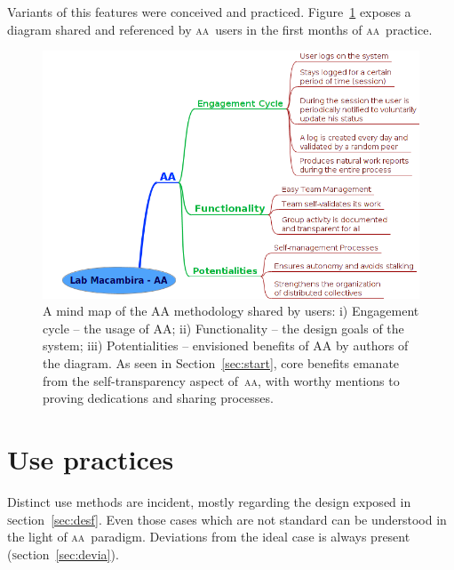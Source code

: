 \documentclass[a4paper, 11pt]{article} %
\newcommand{\sectionb}{\textsc{s}ection}
\newcommand{\aab}{\textsc{aa}}
\begin{document}
Variants of this features were conceived and practiced. Figure~\ref{fig:consult} exposes a diagram shared and referenced by \aab\ users in the first months of \aab\ practice.


\begin{figure}[!h]
    \centering
    \includegraphics[width=\textwidth]{imgs/aaFirstMethodology}
    \caption{A mind map of the AA methodology shared by users: i) Engagement cycle – the usage of AA; ii) Functionality – the design goals of the system; iii) Potentialities – envisioned benefits of AA by authors of the diagram. As seen in Section~\ref{sec:start}, core benefits emanate from the self-transparency aspect of~\aab, with worthy mentions to proving dedications and sharing processes.} 
    \label{fig:consult}
\end{figure}




\section{Use practices}\label{sec:use}
Distinct use methods are incident, mostly regarding the design exposed in \sectionb~\ref{sec:desf}. Even those cases which are not standard can be understood in the light of \aab\ paradigm. Deviations from the ideal case is always present (\sectionb~\ref{sec:devia}).
\end{document}
